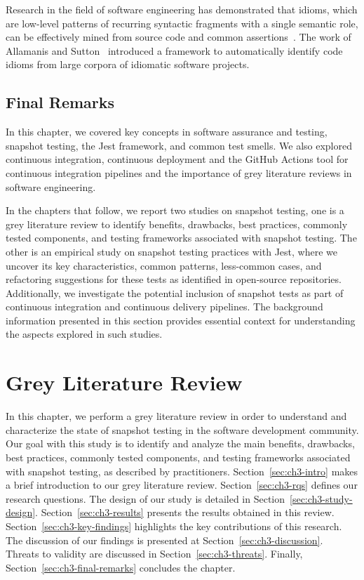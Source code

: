 \documentclass[
	msc, %
	english %
]{../ppgccufmg}
\begin{document}
        Research in the field of software engineering has demonstrated that idioms, which are low-level patterns of recurring syntactic fragments with a single semantic role, can be effectively mined from source code and common assertions~\cite{buschmann1996patterns}. The work of Allamanis and Sutton~\cite{allamanis2014mining} introduced a framework to automatically identify code idioms from large corpora of idiomatic software projects.
        
        

    \section{Final Remarks}\label{sec:ch2-final-remarks}
    
        In this chapter, we covered key concepts in software assurance and testing, snapshot testing, the Jest framework, and common test smells. We also explored continuous integration, continuous deployment and the GitHub Actions tool for continuous integration pipelines and the importance of grey literature reviews in software engineering.

        In the chapters that follow, we report two studies on snapshot testing, one is a grey literature review to identify benefits, drawbacks, best practices, commonly tested components, and testing frameworks associated with snapshot testing. The other is an empirical study on snapshot testing practices with Jest, where we uncover its key characteristics, common patterns, less-common cases, and refactoring suggestions for these tests as identified in open-source repositories. Additionally, we investigate the potential inclusion of snapshot tests as part of continuous integration and continuous delivery pipelines. The background information presented in this section provides essential context for understanding the aspects explored in such studies.

     \chapter{Grey Literature Review}

        In this chapter, we perform a grey literature review in order to understand and characterize the state of snapshot testing in the software development community. Our goal with this study is to identify and analyze the main benefits, drawbacks, best practices, commonly tested components, and testing frameworks associated with snapshot testing, as described by practitioners. Section~\ref{sec:ch3-intro} makes a brief introduction to our grey literature review. Section~\ref{sec:ch3-rqs} defines our research questions. The design of our study is detailed in Section~\ref{sec:ch3-study-design}. Section~\ref{sec:ch3-results} presents the results obtained in this review. Section~\ref{sec:ch3-key-findings} highlights the key contributions of this research. The discussion of our findings is presented at Section~\ref{sec:ch3-discussion}. Threats to validity are discussed in Section~\ref{sec:ch3-threats}. Finally, Section~\ref{sec:ch3-final-remarks} concludes the chapter.
\end{document}
